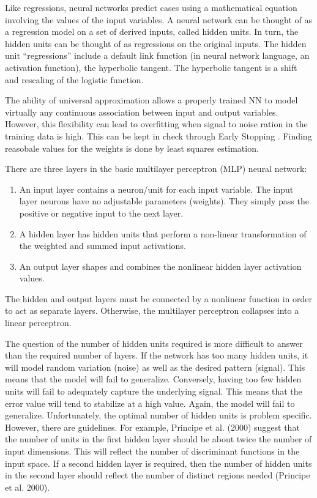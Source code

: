 Like regressions, neural networks predict cases using a mathematical equation involving the values of the input variables. A neural network can be thought of as a regression model on a set of derived inputs, called hidden units. In turn, the hidden units can be thought of as regressions on the original inputs. The hidden unit “regressions” include a default link function (in neural network language, an activation function), the hyperbolic tangent. The hyperbolic tangent is a shift and rescaling of the logistic function.

The ability of universal approximation allows a properly trained NN to model virtually any continuous association between input and output variables. However, this flexibility can lead to overfitting when signal to noise ration in the training data is high. This can be kept in check through Early Stopping \parencite{geron2019hands}. Finding reasobale values for the weights is done by least squares estimation.

There are three layers in the basic multilayer perceptron (MLP) neural network:
\begin{enumerate}
    \item An input layer contains a neuron/unit for each input variable. The input layer neurons have no adjustable parameters (weights). They simply pass the positive or negative input to the next layer.
    \item A hidden layer has hidden units that perform a non-linear transformation of the weighted and summed input activations.
    \item An output layer shapes and combines the nonlinear hidden layer activation values.
\end{enumerate}

The hidden and output layers must be connected by a nonlinear function in order to act as separate layers. Otherwise, the multilayer perceptron collapses into a linear perceptron.


The question of the number of hidden units required is more difficult to answer than the required
number of layers. If the network has too many hidden units, it will model random variation (noise) as
well as the desired pattern (signal). This means that the model will fail to generalize. Conversely,
having too few hidden units will fail to adequately capture the underlying signal. This means that the
error value will tend to stabilize at a high value. Again, the model will fail to generalize.
Unfortunately, the optimal number of hidden units is problem specific.
However, there are guidelines. For example, Principe et al. (2000) suggest that the number of units
in the first hidden layer should be about twice the number of input dimensions. This will reflect the
number of discriminant functions in the input space. If a second hidden layer is required, then the
number of hidden units in the second layer should reflect the number of distinct regions needed
(Principe et al. 2000).


